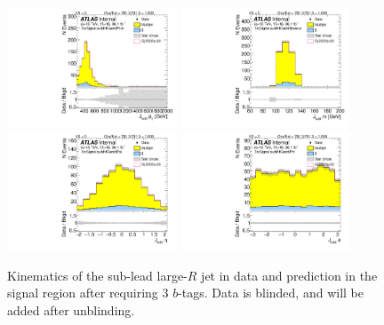\begin{figure}[htbp!]
\begin{center}
\includegraphics[width=0.45\textwidth,angle=-90]{figures/boosted/Signal/b77_ThreeTag_Signal_sublHCand_Pt_m_blind.pdf}
\includegraphics[width=0.45\textwidth,angle=-90]{figures/boosted/Signal/b77_ThreeTag_Signal_sublHCand_Mass_s_blind.pdf}\\
\includegraphics[width=0.45\textwidth,angle=-90]{figures/boosted/Signal/b77_ThreeTag_Signal_sublHCand_Eta_blind.pdf}
\includegraphics[width=0.45\textwidth,angle=-90]{figures/boosted/Signal/b77_ThreeTag_Signal_sublHCand_Phi_blind.pdf}
  \caption{Kinematics of the sub-lead large-$R$ jet in data and prediction in the signal region after requiring 3 $b$-tags. Data is blinded, and will be added after unblinding.}
  \label{fig:boosted-3b-signal-blind-ak10-subl}
\end{center}
\end{figure}

